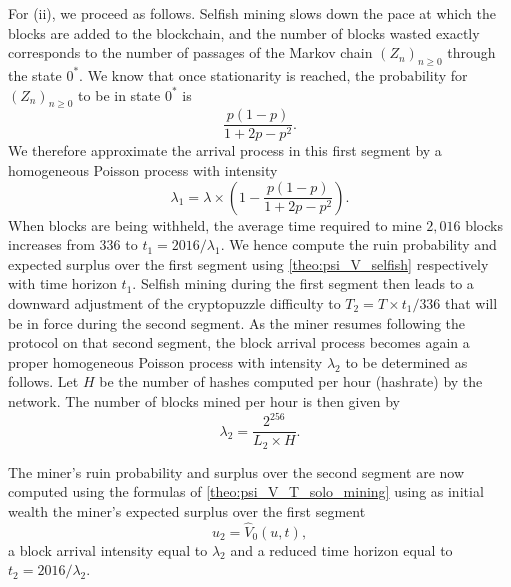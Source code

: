 \noindent For (ii), we proceed as follows. Selfish mining slows down the pace at which the blocks are added to the blockchain, and the number of blocks wasted exactly corresponds to the number of passages of the Markov chain $(Z_n)_{n\geq0}$ through the state $0^\ast$. We know that once stationarity is reached, the probability for  $(Z_n)_{n\geq0}$ to be in state $0^\ast$ is 
$$
\frac{p(1-p)}{1+2p-p^2}.
$$
We therefore approximate the arrival process in this first segment by a homogeneous Poisson process with intensity 
 $$
\lambda_1 = \lambda \times\left(1- \frac{p(1-p)}{ 1+2p-p^2}\right).
$$ 
When blocks are being withheld, the average time required to mine $2,016$ blocks increases from $336$ to $t_1 = 2016/\lambda_1$. We hence compute the ruin probability and expected surplus over the first segment using \cref{theo:psi_V_selfish} respectively with time horizon $t_1$. Selfish mining during the first segment then leads to a downward adjustment of the cryptopuzzle difficulty  to $T_2 = T\times{t_1}/{336}$ that will be in force during the second segment. As the miner resumes following the protocol on that second segment, the block arrival process becomes again a proper homogeneous Poisson process with intensity $\lambda_2$ to be determined as follows. Let $H$ be the number of hashes computed per hour (hashrate) by the network. The number of blocks mined per hour is then given by 
$$
\lambda_2 = \frac{2^{256}}{L_2\times H}.
$$

The miner's ruin probability and surplus over the second segment are now computed using the formulas of \cref{theo:psi_V_T_solo_mining} using as initial wealth the miner's expected surplus over the first segment
\[
u_2 = \widehat{V}_0(u,t), 
\]
a block arrival intensity equal to $\lambda_2$ and a reduced time horizon equal to $t_2=2016/\lambda_2$.\\  


